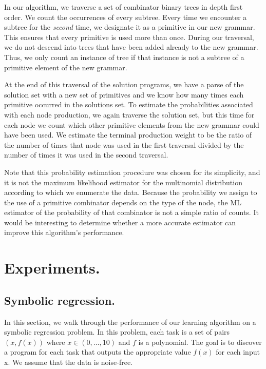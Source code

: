 \documentclass{article}
\begin{document}
In our algorithm, we traverse a set of combinator binary trees in
depth first order. We count the occurrences of every subtree. Every
time we encounter a subtree for the \emph{second} time, we designate
it as a primitive in our new grammar. This ensures that every
primitive is used more than once. During our traversal, we do not
descend into trees that have been added already to the new
grammar. Thus, we only count an instance of tree if that instance is
not a subtree of a primitive element of the new grammar.

At the end of this traversal of the solution programs, we have a parse
of the solution set with a new set of primitives and we know how many
times each primitive occurred in the solutions set. To estimate the
probabilities associated with each node production, we again traverse
the solution set, but this time for each node we count which other
primitive elements from the new grammar could have been used. We
estimate the terminal production weight to be the ratio of the number
of times that node was used in the first traversal divided by the
number of times it was used in the second traversal. 

Note that this probability estimation procedure was chosen for its
simplicity, and it is not the maximum likelihood estimator for the
multinomial distribution according to which we enumerate the
data. Because the probability we assign to the use of a primitive
combinator depends on the type of the node, the ML estimator of the
probability of that combinator is not a simple ratio of counts. It
would be interesting to determine whether a more accurate estimator
can improve this algorithm's performance.

\section{Experiments.}
\subsection{Symbolic regression.}
\label{sec:symreg}

In this section, we walk through the performance of our learning
algorithm on a symbolic regression problem. In this problem,
each task is a set of pairs $ (x, f(x))$ where $x \in (0, \dots, 10)$
and $f$ is a polynomial. The goal is to discover a program for each
task that outputs the appropriate value $f(x)$ for each input x. We
assume that the data is noise-free.


\end{document}

